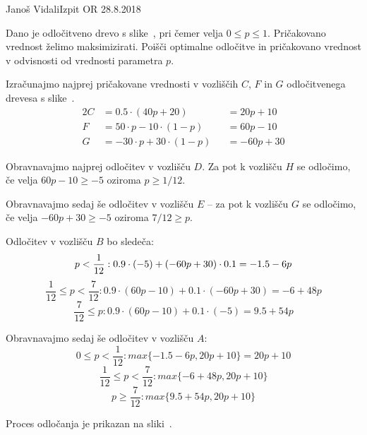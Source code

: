 \begin{naloga}{Janoš Vidali}{Izpit OR 28.8.2018}
\begin{vprasanje}
Dano je odločitveno drevo s slike~\fig,
pri čemer velja $0 \le p \le 1$.
Pričakovano vred\-nost želimo maksimizirati.
Poišči optimalne odločitve in pričakovano vrednost
v odvisnosti od vrednosti parametra $p$.

\begin{slika}
\pgfslika
{}
\end{slika}
\end{vprasanje}

\begin{odgovor}
Izračunajmo najprej pričakovane vrednosti v vozliščih $C$, $F$ in $G$
odločitvenega drevesa s slike~\fig.
\begin{alignat*}{2}
C &= 0.5 \cdot (40 p + 20) &&= 20p + 10 \\
F &= 50 \cdot p - 10 \cdot (1-p) &&= 60 p - 10 \\
G &= - 30 \cdot p + 30 \cdot (1-p) &&=  -60p + 30
\end{alignat*}

Obravnavajmo najprej odločitev v vozlišču $D$.
Za pot k vozlišču $H$ se odločimo,
če velja $60p - 10 \ge -5$ oziroma $p \ge 1/12$.

Obravnavajmo sedaj še odločitev v vozlišču $E$
-- za pot k vozlišču $G$ se odločimo, če velja $-60p + 30 \ge -5$ oziroma $7/12 \ge p$.

Odločitev v vozlišču $B$ bo sledeča:
$$p < {1 \over 12}:  0.9 \cdot (-5) + (-60p + 30) \cdot 0.1 = -1.5 - 6p$$
$$\frac{1}{12} \leq p < \frac{7}{12} : 0.9 \cdot (60p - 10) + 0.1 \cdot (-60p + 30) = -6 + 48p$$
$$\frac{7}{12} \leq p : 0.9 \cdot (60p - 10) + 0.1 \cdot (-5) = 9.5 + 54 p$$

Obravnavajmo sedaj še odločitev v vozlišču $A$:
$$0 \leq p < \frac{1}{12} : max \{ -1.5 - 6p, 20p + 10 \} = 20p + 10$$
$$\frac{1}{12} \leq p < \frac{7}{12} : max \{ -6 + 48p, 20p + 10 \}$$
$$p \ge \frac{7}{12} : max \{ 9.5 + 54p, 20p + 10 \}$$

Proces odločanja je prikazan na sliki~.

\begin{slika}
\end{slika}


\end{odgovor}
\end{naloga}

